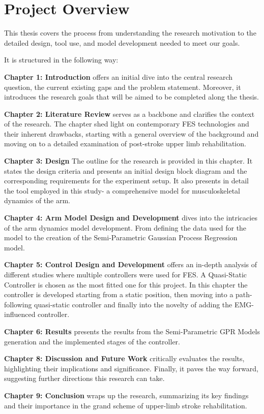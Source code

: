 \section{Project Overview}

This thesis covers the process from understanding the research motivation to the detailed design, tool use, and model development needed to meet our goals.

It is structured in the following way:

\textbf{Chapter 1: Introduction} offers an initial dive into the central research question, the current existing gaps and the problem statement. Moreover, it introduces the research goals that will be aimed to be completed along the thesis.

\textbf{Chapter 2: Literature Review} serves as a backbone and clarifies the context of the research. The chapter shed light on contemporary FES technologies and their inherent drawbacks, starting with a general overview of the background and moving on to a detailed examination of post-stroke upper limb rehabilitation.

\textbf{Chapter 3: Design} The outline for the research is provided in this chapter. It states the design criteria and presents an initial design block diagram and the corresponding requirements for the experiment setup. It also presents in detail the tool employed in this study- a comprehensive model for musculoskeletal dynamics of the arm. 

\textbf{Chapter 4: Arm Model Design and Development} dives into the intricacies of the arm dynamics model development. From defining the data used for the model to the creation of the Semi-Parametric Gaussian Process Regression model.

\textbf{Chapter 5: Control Design and Development} offers an in-depth analysis of different studies where multiple controllers were used for FES. A Quasi-Static Controller is chosen as the most fitted one for this project. In this chapter the controller is developed starting from a static position, then moving into a path-following quasi-static controller and finally into the novelty of adding the EMG-influenced controller.

\textbf{Chapter 6: Results} presents the results from the Semi-Parametric GPR Models generation and the implemented stages of the controller.

\textbf{Chapter 8: Discussion and Future Work} critically evaluates the results, highlighting their implications and significance. Finally, it paves the way forward, suggesting further directions this research can take.

\textbf{Chapter 9: Conclusion} wraps up the research, summarizing its key findings and their importance in the grand scheme of upper-limb stroke rehabilitation. 